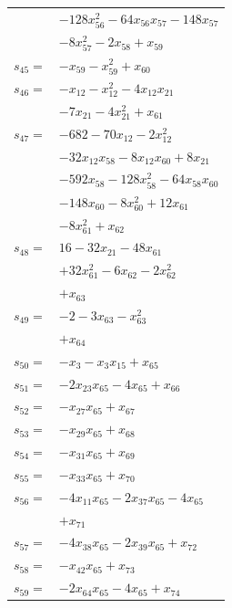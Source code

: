 \begin{longtable}{@{}r@{\;}l@{}}
 & \(\displaystyle -128x_{56}^{2} -64x_{56}x_{57} -148x_{57}\) \\
 & \(\displaystyle -8x_{57}^{2} -2x_{58} +x_{59}\) \\[3pt]
\(s_{45}=\) & \(\displaystyle -x_{59} -x_{59}^{2} +x_{60}\) \\[3pt]
\(s_{46}=\) & \(\displaystyle -x_{12} -x_{12}^{2} -4x_{12}x_{21}\) \\
 & \(\displaystyle -7x_{21} -4x_{21}^{2} +x_{61}\) \\[3pt]
\(s_{47}=\) & \(\displaystyle -682 -70x_{12} -2x_{12}^{2}\) \\
 & \(\displaystyle -32x_{12}x_{58} -8x_{12}x_{60} +8x_{21}\) \\
 & \(\displaystyle -592x_{58} -128x_{58}^{2} -64x_{58}x_{60}\) \\
 & \(\displaystyle -148x_{60} -8x_{60}^{2} +12x_{61}\) \\
 & \(\displaystyle -8x_{61}^{2} +x_{62}\) \\[3pt]
\(s_{48}=\) & \(\displaystyle 16 -32x_{21} -48x_{61}\) \\
 & \(\displaystyle +32x_{61}^{2} -6x_{62} -2x_{62}^{2}\) \\
 & \(\displaystyle +x_{63}\) \\[3pt]
\(s_{49}=\) & \(\displaystyle -2 -3x_{63} -x_{63}^{2}\) \\
 & \(\displaystyle +x_{64}\) \\[3pt]
\(s_{50}=\) & \(\displaystyle -x_{3} -x_{3}x_{15} +x_{65}\) \\[3pt]
\(s_{51}=\) & \(\displaystyle -2x_{23}x_{65} -4x_{65} +x_{66}\) \\[3pt]
\(s_{52}=\) & \(\displaystyle -x_{27}x_{65} +x_{67}\) \\[3pt]
\(s_{53}=\) & \(\displaystyle -x_{29}x_{65} +x_{68}\) \\[3pt]
\(s_{54}=\) & \(\displaystyle -x_{31}x_{65} +x_{69}\) \\[3pt]
\(s_{55}=\) & \(\displaystyle -x_{33}x_{65} +x_{70}\) \\[3pt]
\(s_{56}=\) & \(\displaystyle -4x_{11}x_{65} -2x_{37}x_{65} -4x_{65}\) \\
 & \(\displaystyle +x_{71}\) \\[3pt]
\(s_{57}=\) & \(\displaystyle -4x_{38}x_{65} -2x_{39}x_{65} +x_{72}\) \\[3pt]
\(s_{58}=\) & \(\displaystyle -x_{42}x_{65} +x_{73}\) \\[3pt]
\(s_{59}=\) & \(\displaystyle -2x_{64}x_{65} -4x_{65} +x_{74}\) \\[3pt]

\end{longtable}
